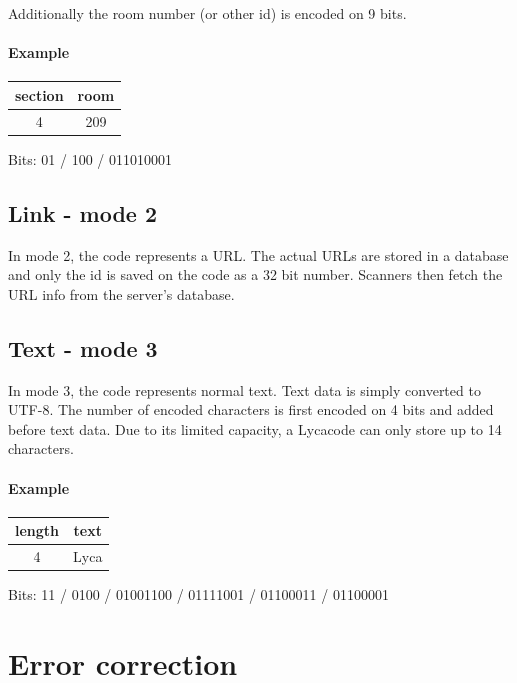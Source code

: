 Additionally the room number (or other id) is encoded on 9 bits.

\paragraph{Example}

\begin{center}
  \begin{tabular}{c|c}
    section & room \\
    \hline
    4 & 209 \\
  \end{tabular}

  Bits: 01 / 100 / 011010001
\end{center}

\subsection{Link - mode 2}
\label{ssec:lycacode_mode2}

In mode 2, the code represents a URL. The actual URLs are stored in a database and only the id is saved on the code as a 32 bit number. Scanners then fetch the URL info from the server's database.

\subsection{Text - mode 3}
\label{ssec:lycacode_mode3}

In mode 3, the code represents normal text. Text data is simply converted to UTF-8. The number of encoded characters is first encoded on 4 bits and added before text data. Due to its limited capacity, a Lycacode can only store up to 14 characters.

\paragraph{Example}

\begin{center}
  \begin{tabular}{c|c}
    length & text \\
    \hline
    4 & Lyca \\
  \end{tabular}

  Bits: 11 / 0100 / 01001100 / 01111001 / 01100011 / 01100001
\end{center}

\section{Error correction}
\label{sec:lycacode_err_corr}

